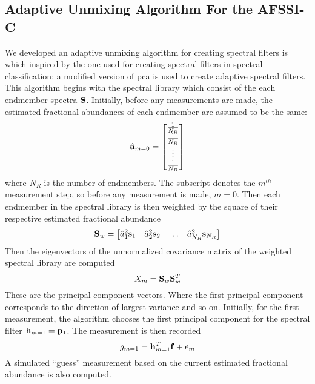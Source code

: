 \subsection{Adaptive Unmixing Algorithm For the AFSSI-C}\label{sec:unmixingAlgo}

We developed an adaptive unmixing algorithm for creating spectral filters is which inspired by the one used for creating spectral filters in spectral classification: a modified version of \gls{pca} is used to create adaptive spectral filters. This algorithm begins with the spectral library which consist of the each endmember spectra $\displaystyle \mathbf{S}$. Initially, before any measurements are made, the estimated fractional abundances of each endmember are assumed to be the same: 
%
\begin{equation}
	\hat{ \displaystyle \mathbf{a} }_{m=0} = 
	\begin{bmatrix}
	\frac{1}{N_R} \\
	\frac{1}{N_R} \\
	\vdots \\
	\frac{1}{N_R}
	\end{bmatrix}
\end{equation}
%
where $N_R$ is the number of endmembers. The subscript denotes the $m^{th}$ measurement step, so before any measurement is made, $m=0$. Then each endmember in the spectral library is then weighted by the square of their respective estimated fractional abundance
%
\begin{equation}
	\displaystyle \mathbf{S}_w = 
	\begin{bmatrix}
		\hat{a}_1^2 \displaystyle \mathbf{s}_1 & \hat{a}_2^2 \displaystyle \mathbf{s}_2 & \hdots & \hat{a}_{N_R}^2 \displaystyle \mathbf{s}_{N_R}
	\end{bmatrix}
	\label{eq:weightedSpectralLibrary}
\end{equation}
%
Then the eigenvectors of the unnormalized covariance matrix of the weighted spectral library are computed
%
\begin{equation}
	X_m = \displaystyle \mathbf{S}_w \displaystyle \mathbf{S}_w^T 
\end{equation}
%
These are the principal component vectors. Where the first principal component corresponds to the direction of largest variance and so on. Initially, for the first measurement, the algorithm chooses the first principal component for the spectral filter $\displaystyle \mathbf{h}_{m=1} = \displaystyle \mathbf{p}_1$. The measurement is then recorded
%
\begin{equation}
	g_{m=1} = \displaystyle \mathbf{h}_{m=1}^{T} \displaystyle \mathbf{f} + e_{m}
\end{equation}
%
A simulated ``guess'' measurement based on the current estimated fractional abundance is also computed. 

